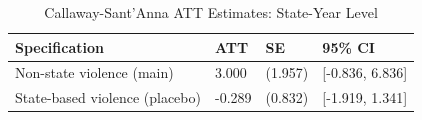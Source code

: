 \begin{table}[!h]
\centering
\caption{\label{tab:tab:cs_att}Callaway-Sant'Anna ATT Estimates: State-Year Level}
\centering
\begin{tabular}[t]{llll}
\toprule
Specification & ATT & SE & 95\% CI\\
\midrule
Non-state violence (main) & 3.000 & (1.957) & {}[-0.836, 6.836]\\
State-based violence (placebo) & -0.289 & (0.832) & {}[-1.919, 1.341]\\
\bottomrule
\end{tabular}
\end{table}
